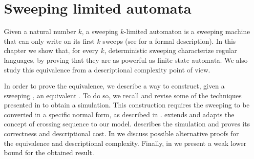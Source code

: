 \chapter{Sweeping limited automata}\label{ch:sweeping}
Given a natural number $k$, a sweeping $k$-limited automaton is a sweeping machine that can only write on its first $k$ sweeps (see  for a formal description).
In this chapter we show that, for every $k$, deterministic sweeping \kLAs characterize regular languages, by proving that they are as powerful as finite state automata. We also study this equivalence from a descriptional complexity point of view.

In order to prove the equivalence, we describe a way to construct, given a sweeping \kDLA, an equivalent \ONFA.
To do so, we recall and revise some of the techniques presented in  to obtain a simulation.
This construction requires the sweeping \kDLA to be converted in a specific normal form, as described in .
 extends and adapts the concept of crossing sequence to our model.
 describes the simulation and proves its correctness and descriptional cost.
In  we discuss possible alternative proofs for the equivalence and descriptional complexity.
Finally, in  we present a weak lower bound for the obtained result.



